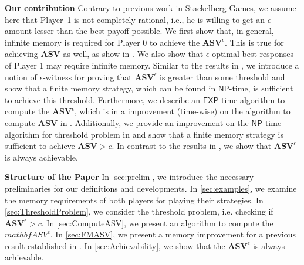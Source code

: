 \textbf{\bf Our contribution} Contrary to previous work in Stackelberg Games, we assume here that Player~1 is not completely rational, i.e., he is willing to get an $\epsilon$ amount lesser than the best payoff possible. We first show that, in general, infinite memory is required for Player 0 to achieve the $\mathbf{ASV}^{\epsilon}$. This is true for achieving $\mathbf{ASV}$ as well, as show in \cite{FGR20}. We also show that $\epsilon$-optimal best-responses of Player 1 may require infinite memory. Similar to the results in \cite{FGR20}, we introduce a notion of $\epsilon$-witness for proving that $\mathbf{ASV}^{\epsilon}$ is greater than some threshold and show that a finite memory strategy, which can be found in $\mathsf{NP}$-time, is sufficient to achieve this threshold. Furthermore, we describe an $\mathsf{EXP}$-time algorithm to compute the $\mathbf{ASV}^{\epsilon}$, which is in a improvement (time-wise) on the algorithm to compute $\mathbf{ASV}$ in \cite{FGR20}. Additionally, we provide an improvement on the $\mathsf{NP}$-time algorithm for threshold problem in \cite{FGR20} and show that a finite memory strategy is sufficient to achieve $\mathbf{ASV} > c$. In contrast to the results in \cite{FGR20}, we show that $\mathbf{ASV}^{\epsilon}$ is always achievable.

\textbf{Structure of the Paper} In \cref{sec:prelim}, we introduce the necessary preliminaries for our definitions and developments. In \cref{sec:examples}, we examine the memory requirements of both players for playing their strategies. In \cref{sec:ThresholdProblem}, we consider the threshold problem, i.e. checking if $\mathbf{ASV}^{\epsilon} > c$. In \cref{sec:ComputeASV}, we present an algorithm to compute the $mathbf{ASV}^{\epsilon}$. In \cref{sec:FMASV}, we present a memory improvement for a previous result established in \cite{FGR20}. In \cref{sec:Achievability}, we show that the $\mathbf{ASV}^{\epsilon}$ is always achievable.